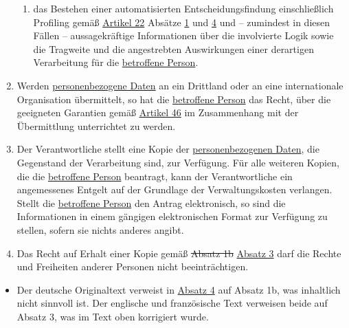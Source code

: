 \begin{enumerate}
\begin{enumerate}
    \item das Bestehen einer automatisierten Entscheidungsfindung einschließlich Profiling gemäß \hyperref[ch:22]
     {Artikel 22} Absätze \hyperref[itm:22-1]{1} und \hyperref[itm:22-4]{4} und -- zumindest in diesen Fällen --
     aussagekräftige Informationen über die involvierte Logik sowie die Tragweite und die angestrebten Auswirkungen
     einer derartigen Verarbeitung für die \hyperref[itm:04-1]{betroffene Person}.
    \label{itm:15-1h}

  \end{enumerate}

  \item Werden \hyperref[itm:04-1]{personenbezogene Daten} an ein Drittland oder an eine internationale Organisation übermittelt, so hat die
   \hyperref[itm:04-1]{betroffene Person} das Recht, über die geeigneten Garantien gemäß \hyperref[ch:46]{Artikel 46} im Zusammenhang mit der
   Übermittlung unterrichtet zu werden.
  \label{itm:15-2}

  \item Der Verantwortliche stellt eine Kopie der \hyperref[itm:04-1]{personenbezogenen Daten}, die Gegenstand der Verarbeitung sind, zur
   Verfügung. Für alle weiteren Kopien, die die \hyperref[itm:04-1]{betroffene Person} beantragt, kann der Verantwortliche ein angemessenes
   Entgelt auf der Grundlage der Verwaltungskosten verlangen. Stellt die \hyperref[itm:04-1]{betroffene Person} den Antrag elektronisch, so
   sind die Informationen in einem gängigen elektronischen Format zur Verfügung zu stellen, sofern sie nichts anderes
   angibt.
  \label{itm:15-3}

  \item Das Recht auf Erhalt einer Kopie gemäß \sout{Absatz 1b} \hyperref[itm:15-3]{Absatz 3} darf die Rechte und
   Freiheiten anderer Personen nicht beeinträchtigen.
  \label{itm:15-4}

\end{enumerate}


\begin{itemize}

  \item Der deutsche Originaltext verweist in \hyperref[itm:15-4]{Absatz 4} auf Absatz 1b, was inhaltlich nicht sinnvoll
   ist. Der englische und französische Text verweisen beide auf Absatz 3, was im Text oben korrigiert wurde.

\end{itemize}

